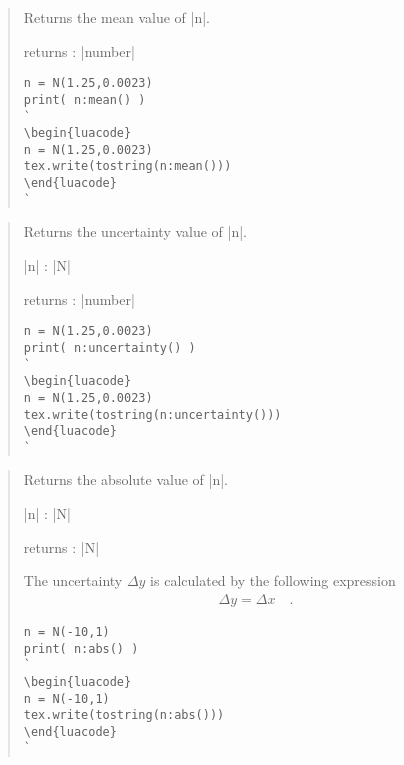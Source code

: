 \documentclass{ltxdoc}
\begin{document}
\begin{quote}
  Returns the mean value of |n|.

  \subtitle{Parameters / Return}
  \begin{description}
  \item returns : |number|
  \end{description}

\begin{lstlisting}
n = N(1.25,0.0023)
print( n:mean() )
`
\begin{luacode}
n = N(1.25,0.0023)
tex.write(tostring(n:mean()))
\end{luacode}
`
\end{lstlisting}

\end{quote}

\begin{quote}
  Returns the uncertainty value of |n|.

  \begin{description}
  \item |n| : |N|

  \item returns : |number|
  \end{description}

\begin{lstlisting}
n = N(1.25,0.0023)
print( n:uncertainty() )
`
\begin{luacode}
n = N(1.25,0.0023)
tex.write(tostring(n:uncertainty()))
\end{luacode}
`
\end{lstlisting}

\end{quote}


\begin{quote}
  Returns the absolute value of |n|.

  \begin{description}
  \item |n| : |N|

  \item returns : |N|
  \end{description}

  The uncertainty $\Delta y$ is calculated by the following expression
  \begin{align*}
    \Delta y = \Delta x \quad.
  \end{align*}

\begin{lstlisting}
n = N(-10,1)
print( n:abs() )
`
\begin{luacode}
n = N(-10,1)
tex.write(tostring(n:abs()))
\end{luacode}
`
\end{lstlisting}

\end{quote}
\end{document}
